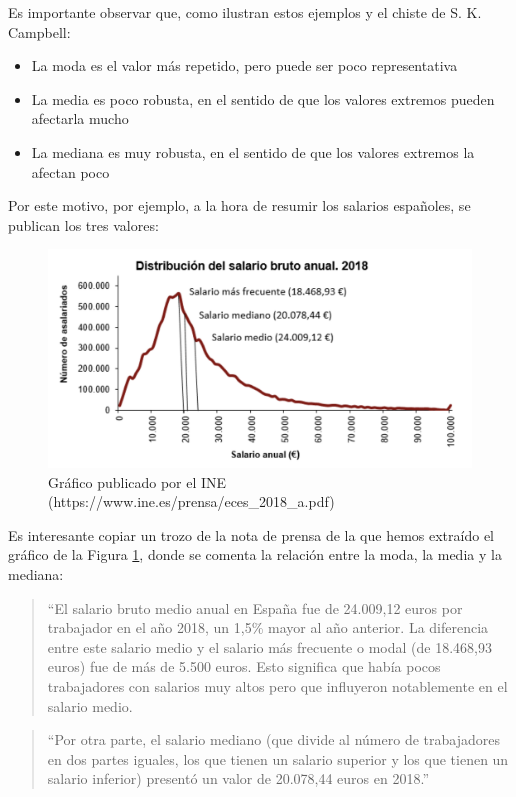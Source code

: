 \documentclass[
]{book}
\theoremstyle{definition}
\theoremstyle{definition}
\theoremstyle{definition}
\theoremstyle{definition}
\theoremstyle{remark}
\begin{document}
\begin{rmdimportant}
Es importante observar que, como ilustran estos ejemplos y el chiste de S. K. Campbell:

\begin{itemize}
\item
  La moda es el valor más repetido, pero puede ser poco representativa
\item
  La media es poco robusta, en el sentido de que los valores extremos pueden afectarla mucho
\item
  La mediana es muy robusta, en el sentido de que los valores extremos la afectan poco
\end{itemize}
\end{rmdimportant}

Por este motivo, por ejemplo, a la hora de resumir los salarios españoles, se publican los tres valores:

\begin{figure}

{\centering \includegraphics[width=0.6\linewidth]{INREMDN_files/figure-html/salaris} 

}

\caption{Gráfico publicado por el INE  (https://www.ine.es/prensa/eces_2018_a.pdf)}\label{fig:salaris}
\end{figure}

Es interesante copiar un trozo de la nota de prensa de la que hemos extraído el gráfico de la Figura \ref{fig:salaris}, donde se comenta la relación entre la moda, la media y la mediana:

\begin{quote}
``El salario bruto medio anual en España fue de 24.009,12 euros por trabajador en el año 2018, un 1,5\% mayor al año anterior. La diferencia entre este salario medio y el salario más frecuente o modal (de 18.468,93 euros) fue de más de 5.500 euros. Esto significa que había pocos trabajadores con salarios muy altos pero que influyeron notablemente en el salario medio.
\end{quote}

\begin{quote}
``Por otra parte, el salario mediano (que divide al número de trabajadores en dos partes iguales, los que tienen un salario superior y los que tienen un salario inferior) presentó un valor de 20.078,44 euros en 2018.''
\end{quote}
\end{document}
